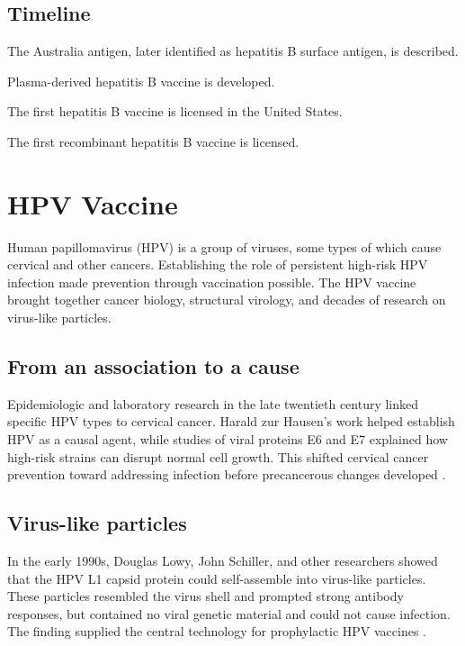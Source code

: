 \documentclass[12pt,oneside]{book}
\begin{document}
\section*{Timeline}
\begin{description}[leftmargin=2.3cm,style=nextline]
  \item[1965] The Australia antigen, later identified as hepatitis B surface antigen, is described.
  \item[1970s] Plasma-derived hepatitis B vaccine is developed.
  \item[1981] The first hepatitis B vaccine is licensed in the United States.
  \item[1986] The first recombinant hepatitis B vaccine is licensed.
\end{description}
\chapter[HPV Vaccine]{HPV Vaccine}

Human papillomavirus (HPV) is a group of viruses, some types of which cause
cervical and other cancers. Establishing the role of persistent high-risk HPV
infection made prevention through vaccination possible. The HPV vaccine
brought together cancer biology, structural virology, and decades of research
on virus-like particles.

\section{From an association to a cause}
Epidemiologic and laboratory research in the late twentieth century linked specific HPV types to cervical cancer. Harald zur Hausen's work helped establish HPV as a causal agent, while studies of viral proteins E6 and E7 explained how high-risk strains can disrupt normal cell growth. This shifted cervical cancer prevention toward addressing infection before precancerous changes developed \cite{nciHPVVaccine}.

\section{Virus-like particles}
In the early 1990s, Douglas Lowy, John Schiller, and other researchers showed that the HPV L1 capsid protein could self-assemble into virus-like particles. These particles resembled the virus shell and prompted strong antibody responses, but contained no viral genetic material and could not cause infection. The finding supplied the central technology for prophylactic HPV vaccines \cite{nciHPVVaccine}.
\end{document}
